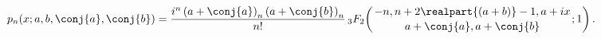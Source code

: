 \[\mathop{p_{n}\/}\nolimits\!\left(x;a,b,\conj{a},\conj{b}\right)=\frac{i^{n}%
\left(a+\conj{a}\right)_{n}\left(a+\conj{b}\right)_{n}}{n!}\*\mathop{{{}_{3}F_%
{2}}\/}\nolimits\!\left({-n,n+2\realpart{(a+b)}-1,a+ix\atop a+\conj{a},a+\conj%
{b}};1\right).\]